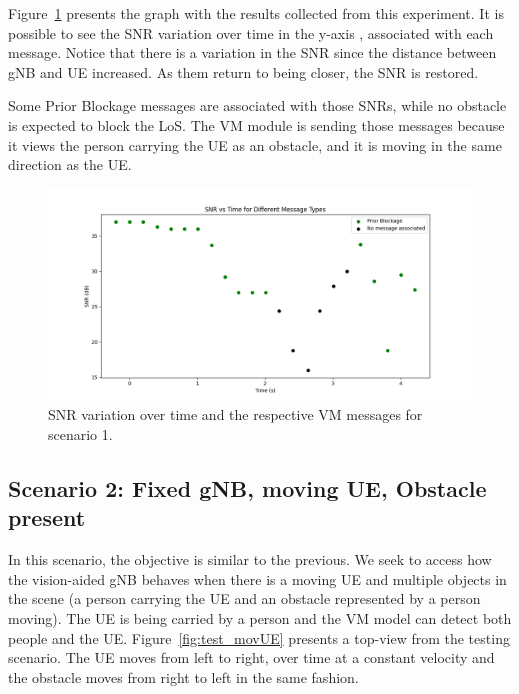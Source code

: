 Figure~\ref{fig:results_1} presents the graph with the results collected from this experiment.
It is possible to see the SNR variation over time in the y-axis , associated with each message.
Notice that there is a variation in the SNR since the distance between gNB and UE increased.
As them return to being closer, the SNR is restored.

Some Prior Blockage messages are associated with those SNRs, while no obstacle is expected to block the LoS\@.
The VM module is sending those messages because it views the person carrying the UE as an obstacle, and it is moving in the same direction as the UE\@.

\begin{figure}[H]
    \centering
    \includegraphics[width=\linewidth]{figures/results_1}
    \caption{SNR variation over time and the respective VM messages for scenario 1.}
    \label{fig:results_1}
\end{figure}

\subsection{Scenario 2: Fixed gNB, moving UE, Obstacle present}\label{subsec:scenario-0.1:-fixed-gnb-moving-ue-obstacle-present}

In this scenario, the objective is similar to the previous.
We seek to access how the vision-aided gNB behaves when there is a moving UE and multiple objects in the scene (a person carrying the UE and an obstacle represented by a person moving)\@.
The UE is being carried by a person and the VM model can detect both people and the UE\@.
Figure~\ref{fig:test_movUE} presents a top-view from the testing scenario.
The UE moves from left to right, over time at a constant velocity and the obstacle moves from right to left in the same fashion.

